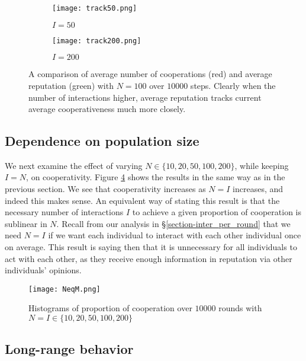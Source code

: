 \documentclass{amsart}
\begin{document}
\begin{figure}[h!tbp]
  \begin{subfigure}{.485\linewidth}
    \texttt{[image: track50.png]}
    \caption{$I=50$}
    \label{figure-track50}
  \end{subfigure}
  \hspace{.01\linewidth}
  \begin{subfigure}{.485\linewidth}
    \texttt{[image: track200.png]}
    \caption{$I=200$}
    \label{figure-track200}
  \end{subfigure}
\caption{A comparison of average number of cooperations (red) and
  average reputation (green) with $N=100$ over $10000$ steps. Clearly
  when the number of interactions higher, average reputation tracks
  current average cooperativeness much more closely.}
\end{figure}

\subsection{Dependence on population size}
\label{section-pop_size}

We next examine the effect of varying $N \in \{10, 20, 50, 100,
200\}$, while keeping $I=N$, on cooperativity. Figure
\ref{figure-NeqM} shows the results in the same way as in the previous
section. We see that cooperativity increases as $N=I$ increases, and
indeed this makes sense. An equivalent way of stating this result is
that the necessary number of interactions $I$ to achieve a given
proportion of cooperation is sublinear in $N$. Recall from our
analysis in \S\ref{section-inter_per_round} that we need $N=I$ if we
want each individual to interact with each other individual once on
average. This result is saying then that it is unnecessary for all
individuals to act with each other, as they receive enough information
in reputation via other individuals' opinions.

\begin{figure}[h!tbp]
    \centering
    \texttt{[image: NeqM.png]}
    \caption{Histograms of proportion of cooperation over $10000$
      rounds with $N=I \in \{10,20,50,100,200\}$}
    \label{figure-NeqM}
\end{figure}

\subsection{Long-range behavior}
\label{section-longrange}
\end{document}
